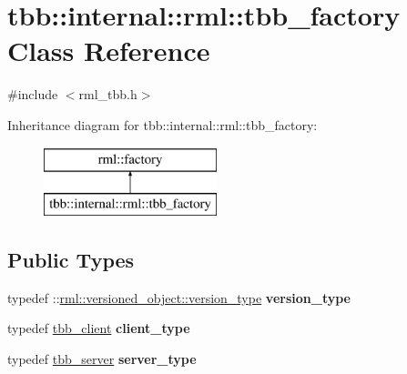 \hypertarget{classtbb_1_1internal_1_1rml_1_1tbb__factory}{}\section{tbb\+:\+:internal\+:\+:rml\+:\+:tbb\+\_\+factory Class Reference}
\label{classtbb_1_1internal_1_1rml_1_1tbb__factory}


{\ttfamily \#include $<$rml\+\_\+tbb.\+h$>$}

Inheritance diagram for tbb\+:\+:internal\+:\+:rml\+:\+:tbb\+\_\+factory\+:\begin{figure}[H]
\begin{center}
\leavevmode
\includegraphics[height=2.000000cm]{classtbb_1_1internal_1_1rml_1_1tbb__factory}
\end{center}
\end{figure}
\subsection*{Public Types}
\begin{DoxyCompactItemize}
\item 
\hypertarget{classtbb_1_1internal_1_1rml_1_1tbb__factory_a8bd38f4beaeb53c089cd6f7d2bc1d3d0}{}typedef \+::\hyperlink{classrml_1_1versioned__object_a759650010b271238ef9433442730c423}{rml\+::versioned\+\_\+object\+::version\+\_\+type} {\bfseries version\+\_\+type}\label{classtbb_1_1internal_1_1rml_1_1tbb__factory_a8bd38f4beaeb53c089cd6f7d2bc1d3d0}

\item 
\hypertarget{classtbb_1_1internal_1_1rml_1_1tbb__factory_a5b5493b8ef6617aa87e1ef8c62ecfd02}{}typedef \hyperlink{classtbb_1_1internal_1_1rml_1_1tbb__client}{tbb\+\_\+client} {\bfseries client\+\_\+type}\label{classtbb_1_1internal_1_1rml_1_1tbb__factory_a5b5493b8ef6617aa87e1ef8c62ecfd02}

\item 
\hypertarget{classtbb_1_1internal_1_1rml_1_1tbb__factory_a44660954dca2c2c0175de3857677ab25}{}typedef \hyperlink{classtbb_1_1internal_1_1rml_1_1tbb__server}{tbb\+\_\+server} {\bfseries server\+\_\+type}\label{classtbb_1_1internal_1_1rml_1_1tbb__factory_a44660954dca2c2c0175de3857677ab25}

\end{DoxyCompactItemize}
